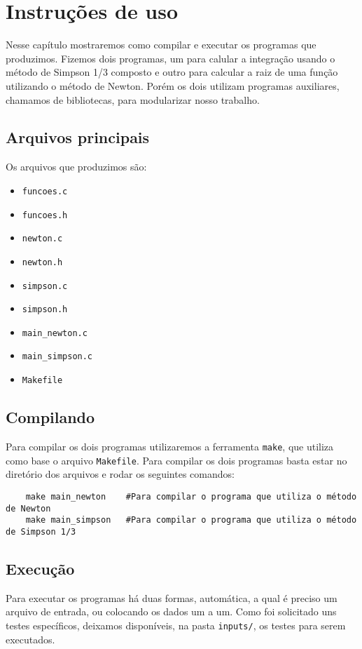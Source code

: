 \chapter{Instruções de uso}
Nesse capítulo mostraremos como compilar e executar os programas que produzimos.
Fizemos dois programas, um para calular a integração usando o método de Simpson
1/3 composto e outro para calcular a raiz de uma função utilizando o método de
Newton. Porém os dois utilizam programas auxiliares, chamamos de bibliotecas,
para modularizar nosso trabalho.

\section{Arquivos principais}
Os arquivos que produzimos são:
\begin{multicols}{2}
	\begin{itemize}
		\item \texttt{funcoes.c}
		\item \texttt{funcoes.h}
		\item \texttt{newton.c}
		\item \texttt{newton.h}
		\item \texttt{simpson.c}
		\item \texttt{simpson.h}
		\item \texttt{main\_newton.c}
		\item \texttt{main\_simpson.c}
		\item \texttt{Makefile}
	\end{itemize}
\end{multicols}

\section{Compilando}
Para compilar os dois programas utilizaremos a ferramenta \texttt{make}, que
utiliza como base o arquivo \texttt{Makefile}. Para compilar os dois programas
basta estar no diretório dos arquivos e rodar os seguintes comandos:

\begin{verbatim}
	make main_newton    #Para compilar o programa que utiliza o método de Newton
	make main_simpson   #Para compilar o programa que utiliza o método de Simpson 1/3
\end{verbatim}

\section{Execução}
Para executar os programas há duas formas, automática, a qual é preciso um
arquivo de entrada, ou colocando os dados um a um. Como foi solicitado uns
testes específicos, deixamos disponíveis, na pasta \texttt{inputs/}, os testes
para serem executados.

